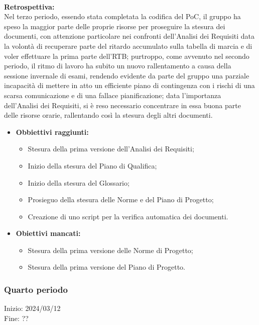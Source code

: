 \paragraph{}
\textbf{Retrospettiva:} \\
Nel terzo periodo, essendo stata completata la codifica del PoC, il gruppo ha speso la maggior parte delle proprie risorse per proseguire la stesura dei documenti, con attenzione
particolare nei confronti dell'Analisi dei Requisiti data la volontà di recuperare parte del ritardo accumulato sulla tabella di marcia e di voler effettuare la prima parte dell'RTB;
purtroppo, come avvenuto nel secondo periodo, il ritmo di lavoro ha subito un nuovo rallentamento a causa della sessione invernale di esami, rendendo evidente da parte del gruppo una
parziale incapacità di mettere in atto un efficiente piano di contingenza con i rischi di una scarsa comunicazione e di una fallace pianificazione; data l'importanza dell'Analisi
dei Requisiti, si è reso necessario concentrare in essa buona parte delle risorse orarie, rallentando così la stesura degli altri documenti.
\begin{itemize}
    \item \textbf{Obbiettivi raggiunti:}
    \begin{itemize}
        \item Stesura della prima versione dell'Analisi dei Requisiti;
        \item Inizio della stesura del Piano di Qualifica;
        \item Inizio della stesura del Glossario;
        \item Prosieguo della stesura delle Norme e del Piano di Progetto;
        \item Creazione di uno script per la verifica automatica dei documenti.
    \end{itemize}
    \item \textbf{Obiettivi mancati:}
    \begin{itemize}
        \item Stesura della prima versione delle Norme di Progetto;
        \item Stesura della prima versione del Piano di Progetto.
    \end{itemize}
\end{itemize}

\subsubsection{Quarto periodo}
Inizio: 2024/03/12 \\
Fine: ?? \\

